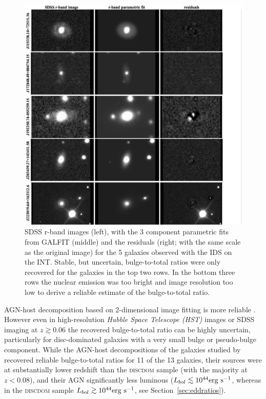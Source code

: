 \begin{figure}
\centering
\includegraphics[width=\textwidth]{agn/galfit_residuals.pdf}
\caption[Parametric fits and residuals for the 5 galaxies observed at the INT]{SDSS r-band images (left), with the 3 component parametric fits from GALFIT (middle) and the residuals (right; with the same scale as the original image) for the 5 galaxies observed with the IDS on the INT. Stable, but uncertain, bulge-to-total ratios were only recovered for the galaxies in the top two rows. In the bottom three rows the nuclear emission was too bright and image resolution too low to derive a reliable estimate of the bulge-to-total ratio.
}
\label{fig:galfit}
\end{figure}

AGN-host decomposition based on 2-dimensional image fitting \citep[e.g.,][]{simard98,peng02,peng10} is more reliable \citep[e.g.][]{mclure99,urry00,mclure01,sanchez04,pierce07,gabor09,Simmons11,Simmons13,koss11}. However even in high-resolution \emph{Hubble Space Telescope (HST)} images \citep{simmons08} or SDSS imaging at $z \gtrsim 0.06$ \citep[][]{koss11,Simmons13} the recovered bulge-to-total ratio can be highly uncertain, particularly for disc-dominated galaxies with a very small bulge or pseudo-bulge \citep{kormendy04} component. While the AGN-host decompositions of the galaxies studied by \citet{Simmons13} recovered reliable bulge-to-total ratios for 11 of the 13 galaxies, their sources were at substantially lower redshift than the \textsc{discdom} sample (with the majority at $z < 0.08$), and their AGN significantly less luminous ($L_{bol} \lesssim 10^{44} \rm{erg}~\rm{s}^{-1}$, whereas in the \textsc{discdom} sample $L_{bol} \gtrsim 10^{44} \rm{erg}~\rm{s}^{-1}$, see Section~\ref{sec:eddratios}). 

